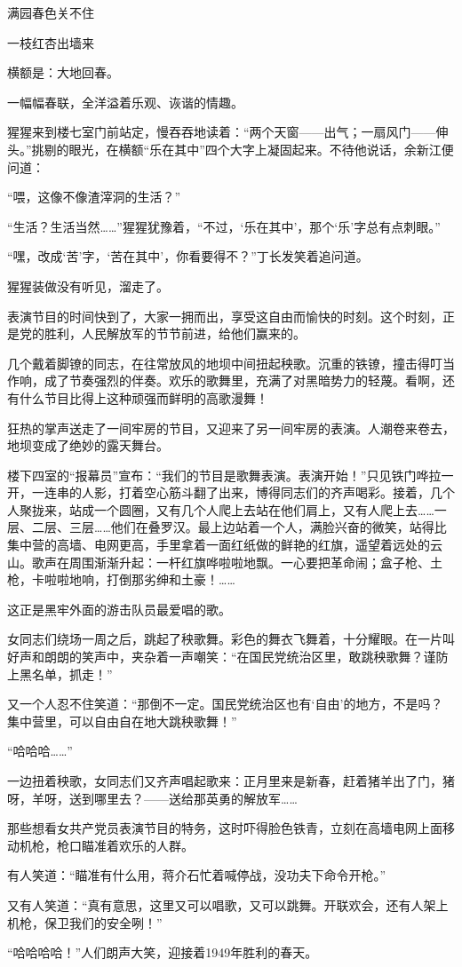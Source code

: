 \documentclass[12pt,UTF-8,openany]{ctexbook}
\begin{document}
\begin{Large}
    满园春色关不住
    
    一枝红杏出墙来
    
    横额是：大地回春。
    
    一幅幅春联，全洋溢着乐观、诙谐的情趣。
    
    猩猩来到楼七室门前站定，慢吞吞地读着：“两个天窗——出气；一扇风门——伸头。”挑剔的眼光，在横额“乐在其中”四个大字上凝固起来。不待他说话，余新江便问道：
    
    “喂，这像不像渣滓洞的生活？”
    
    “生活？生活当然……”猩猩犹豫着，“不过，‘乐在其中’，那个‘乐’字总有点刺眼。”
    
    “嘿，改成‘苦’字，‘苦在其中’，你看要得不？”丁长发笑着追问道。
    
    猩猩装做没有听见，溜走了。
    
    表演节目的时间快到了，大家一拥而出，享受这自由而愉快的时刻。这个时刻，正是党的胜利，人民解放军的节节前进，给他们赢来的。
    
    几个戴着脚镣的同志，在往常放风的地坝中间扭起秧歌。沉重的铁镣，撞击得叮当作响，成了节奏强烈的伴奏。欢乐的歌舞里，充满了对黑暗势力的轻蔑。看啊，还有什么节目比得上这种顽强而鲜明的高歌漫舞！
    
    狂热的掌声送走了一间牢房的节目，又迎来了另一间牢房的表演。人潮卷来卷去，地坝变成了绝妙的露天舞台。
    
    楼下四室的“报幕员”宣布：“我们的节目是歌舞表演。表演开始！”只见铁门哗拉一开，一连串的人影，打着空心筋斗翻了出来，博得同志们的齐声喝彩。接着，几个人聚拢来，站成一个圆圈，又有几个人爬上去站在他们肩上，又有人爬上去……一层、二层、三层……他们在叠罗汉。最上边站着一个人，满脸兴奋的微笑，站得比集中营的高墙、电网更高，手里拿着一面红纸做的鲜艳的红旗，遥望着远处的云山。歌声在周围渐渐升起：一杆红旗哗啦啦地飘。一心要把革命闹；盒子枪、土枪，卡啦啦地响，打倒那劣绅和土豪！……
    
    这正是黑牢外面的游击队员最爱唱的歌。
    
    女同志们绕场一周之后，跳起了秧歌舞。彩色的舞衣飞舞着，十分耀眼。在一片叫好声和朗朗的笑声中，夹杂着一声嘲笑：“在国民党统治区里，敢跳秧歌舞？谨防上黑名单，抓走！”
    
    又一个人忍不住笑道：“那倒不一定。国民党统治区也有‘自由’的地方，不是吗？集中营里，可以自由自在地大跳秧歌舞！”
    
    “哈哈哈……”
    
    一边扭着秧歌，女同志们又齐声唱起歌来：正月里来是新春，赶着猪羊出了门，猪呀，羊呀，送到哪里去？——送给那英勇的解放军……
    
    那些想看女共产党员表演节目的特务，这时吓得脸色铁青，立刻在高墙电网上面移动机枪，枪口瞄准着欢乐的人群。
    
    有人笑道：“瞄准有什么用，蒋介石忙着喊停战，没功夫下命令开枪。”
    
    又有人笑道：“真有意思，这里又可以唱歌，又可以跳舞。开联欢会，还有人架上机枪，保卫我们的安全咧！”
    
    “哈哈哈哈！”人们朗声大笑，迎接着1949年胜利的春天。
    
\end{Large}
\end{document}
